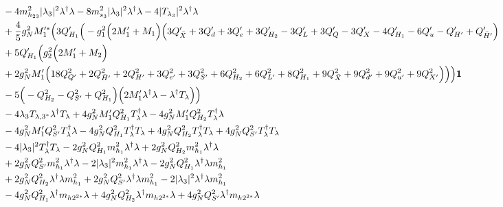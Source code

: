 {\begin{align}
 &-4 m_{h_{23}}^2 |\lambda_3|^2 {\lambda^{\dagger}  \lambda} -8 m_{s_3}^2 |\lambda_3|^2 {\lambda^{\dagger}  \lambda} -4 |T_{\lambda_3}|^2 {\lambda^{\dagger}  \lambda} \nonumber \\ 
 &+\frac{4}{5} g_{N}^{2} M_1'^* \Big(3 Q_{H_1}' \Big(- g_{1}^{2} \Big(2 M_1'  + M_1\Big)\Big(3 Q_{\bar{X}}'  + 3 Q_d'  + 3 Q_e'  + 3 Q_{H_2}'  -3 Q_L'  + 3 Q_Q'  -3 Q_X'  -4 Q_{H_1}'  -6 Q_u'  - Q_{H'}'  + Q_{\bar{H}'}'\Big)\nonumber \\ 
 &+5 Q_{H_1}' \Big(g_{2}^{2} \Big(2 M_1'  + M_2\Big)\nonumber \\ 
 &+2 g_{N}^{2} M_1' \Big(18 Q_{Q'}^{2}  + 2 Q_{\bar{H}'}^{2}  + 2 Q_{H'}^{2}  + 3 Q_{e'}^{2}  + 3 Q_{S'}^{2}  + 6 Q_{H_2}^{2}  + 6 Q_{L'}^{2}  + 8 Q_{H_1}^{2}  + 9 Q_{\bar{X}}^{2}  + 9 Q_{d'}^{2}  + 9 Q_{u'}^{2}  + 9 Q_{X'}^{2} \Big)\Big)\Big){\bf 1} \nonumber \\ 
 &-5 \Big(- Q_{H_2}^{2}  - Q_{S'}^{2}  + Q_{H_1}^{2}\Big)\Big(2 M_1' {\lambda^{\dagger}  \lambda}  - {\lambda^{\dagger}  T_{\lambda}} \Big)\Big)\nonumber \\ 
 &-4 \lambda_3 T_{{\lambda,3}^*} {\lambda^{\dagger}  T_{\lambda}} +4 g_{N}^{2} M_1' Q_{H_1}^{2} {T_{\lambda}^{\dagger}  \lambda} -4 g_{N}^{2} M_1' Q_{H_2}^{2} {T_{\lambda}^{\dagger}  \lambda} \nonumber \\ 
 &-4 g_{N}^{2} M_1' Q_{S'}^{2} {T_{\lambda}^{\dagger}  \lambda} -4 g_{N}^{2} Q_{H_1}^{2} {T_{\lambda}^{\dagger}  T_{\lambda}} +4 g_{N}^{2} Q_{H_2}^{2} {T_{\lambda}^{\dagger}  T_{\lambda}} +4 g_{N}^{2} Q_{S'}^{2} {T_{\lambda}^{\dagger}  T_{\lambda}} \nonumber \\ 
 &-4 |\lambda_3|^2 {T_{\lambda}^{\dagger}  T_{\lambda}} -2 g_{N}^{2} Q_{H_1}^{2} {m_{h_1}^2  \lambda^{\dagger}  \lambda} +2 g_{N}^{2} Q_{H_2}^{2} {m_{h_1}^2  \lambda^{\dagger}  \lambda} \nonumber \\ 
 &+2 g_{N}^{2} Q_{S'}^{2} {m_{h_1}^2  \lambda^{\dagger}  \lambda} -2 |\lambda_3|^2 {m_{h_1}^2  \lambda^{\dagger}  \lambda} -2 g_{N}^{2} Q_{H_1}^{2} {\lambda^{\dagger}  \lambda  m_{h_1}^2} \nonumber \\ 
 &+2 g_{N}^{2} Q_{H_2}^{2} {\lambda^{\dagger}  \lambda  m_{h_1}^2} +2 g_{N}^{2} Q_{S'}^{2} {\lambda^{\dagger}  \lambda  m_{h_1}^2} -2 |\lambda_3|^2 {\lambda^{\dagger}  \lambda  m_{h_1}^2} \nonumber \\ 
 &-4 g_{N}^{2} Q_{H_1}^{2} {\lambda^{\dagger}  m_{{h 2}^{2 *}}  \lambda} +4 g_{N}^{2} Q_{H_2}^{2} {\lambda^{\dagger}  m_{{h 2}^{2 *}}  \lambda} +4 g_{N}^{2} Q_{S'}^{2} {\lambda^{\dagger}  m_{{h 2}^{2 *}}  \lambda} \nonumber \\ 

\end{align}}
